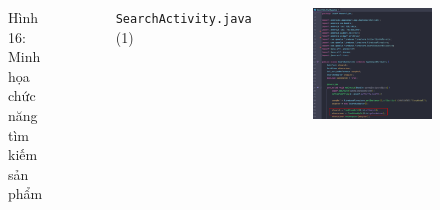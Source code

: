 \documentclass{beamer}
\begin{document}
\begin{frame}
\begin{columns}
\begin{figure}
            \caption{\centering\tiny{Hình 16: Minh họa chức năng tìm kiếm sản phẩm}}
        \end{figure}
        \indent \texttt{SearchActivity.java} (1)
        \begin{figure}
            \centering
            \includegraphics[width=\textwidth]{images/50.png}
        \end{figure}
    \end{columns}
\end{frame}
\end{document}

